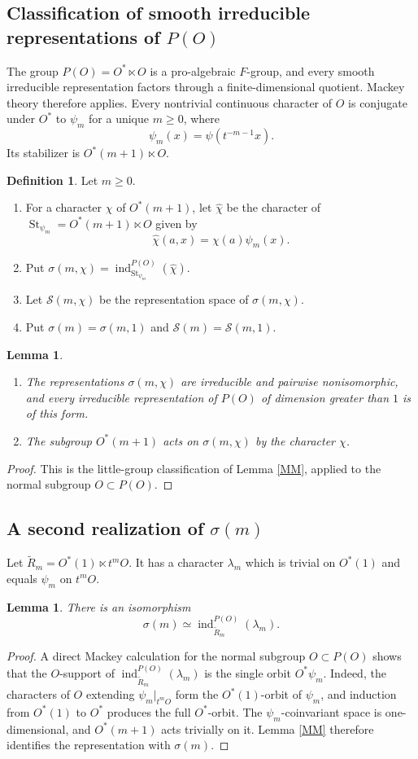 \documentclass[11pt,a4paper,twoside]{amsart}
\newtheorem{lemma}[theorem]{Lemma}
\theoremstyle{definition}
\newtheorem{definition}[theorem]{Definition}
\theoremstyle{remark}
\newcommand{\bl}{\lambda}
\newcommand{\bs}{\sigma}
\newcommand{\mcS}{\mathcal S}
\newcommand{\ind}{\operatorname{ind}}
\newcommand{\St}{\operatorname{St}}
\begin{document}
\subsection{Classification of smooth irreducible representations of $P(O)$}
The group $P(O)=O^*\ltimes O$ is a pro-algebraic $F$-group, and every smooth irreducible representation factors through a finite-dimensional quotient. Mackey theory therefore applies. Every nontrivial continuous character of $O$ is conjugate under $O^*$ to $\psi_m$ for a unique $m\geq0$, where
$$
\psi_m(x)=\psi(t^{-m-1}x).
$$
Its stabilizer is $O^*(m+1)\ltimes O$.
\begin{definition}\label{ph}
Let $m\geq0$.
\begin{enumerate}
\item For a character $\chi$ of $O^*(m+1)$, let $\widehat\chi$ be the character of $\St_{\psi_m}=O^*(m+1)\ltimes O$ given by
$$
\widehat\chi(a,x)=\chi(a)\psi_m(x).
$$
\item Put $\bs(m,\chi)=\ind_{\St_{\psi_m}}^{P(O)}(\widehat\chi)$.
\item Let $\mcS(m,\chi)$ be the representation space of $\bs(m,\chi)$.
\item Put $\bs(m)=\bs(m,1)$ and $\mcS(m)=\mcS(m,1)$.
\end{enumerate}
\end{definition}
\begin{lemma}\label{p-o}
\begin{enumerate}
\item The representations $\bs(m,\chi)$ are irreducible and pairwise nonisomorphic, and every irreducible representation of $P(O)$ of dimension greater than $1$ is of this form.
\item The subgroup $O^*(m+1)$ acts on $\bs(m,\chi)$ by the character $\chi$.
\end{enumerate}
\end{lemma}
\begin{proof}
This is the little-group classification of Lemma \ref{MM}, applied to the normal subgroup $O\subset P(O)$.
\end{proof}
\subsection{A second realization of $\bs(m)$}
Let $\widetilde R_m=O^*(1)\ltimes t^mO$. It has a character $\bl_m$ which is trivial on $O^*(1)$ and equals $\psi_m$ on $t^mO$.
\begin{lemma}\label{sec}
There is an isomorphism
$$
\bs(m)\simeq\ind_{\widetilde R_m}^{P(O)}(\bl_m).
$$
\end{lemma}
\begin{proof}
A direct Mackey calculation for the normal subgroup $O\subset P(O)$ shows that the $O$-support of $\ind_{\widetilde R_m}^{P(O)}(\bl_m)$ is the single orbit $O^*\psi_m$. Indeed, the characters of $O$ extending $\psi_m|_{t^mO}$ form the $O^*(1)$-orbit of $\psi_m$, and induction from $O^*(1)$ to $O^*$ produces the full $O^*$-orbit. The $\psi_m$-coinvariant space is one-dimensional, and $O^*(m+1)$ acts trivially on it. Lemma \ref{MM} therefore identifies the representation with $\bs(m)$.
\end{proof}
\end{document}
